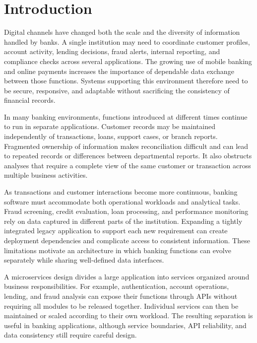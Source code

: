 \documentclass[conference]{IEEEtran}
\begin{document}
\section{Introduction}

Digital channels have changed both the scale and the diversity of information handled by banks. A single institution may need to coordinate customer profiles, account activity, lending decisions, fraud alerts, internal reporting, and compliance checks across several applications. The growing use of mobile banking and online payments increases the importance of dependable data exchange between those functions. Systems supporting this environment therefore need to be secure, responsive, and adaptable without sacrificing the consistency of financial records.

In many banking environments, functions introduced at different times continue to run in separate applications. Customer records may be maintained independently of transactions, loans, support cases, or branch reports. Fragmented ownership of information makes reconciliation difficult and can lead to repeated records or differences between departmental reports. It also obstructs analyses that require a complete view of the same customer or transaction across multiple business activities.

As transactions and customer interactions become more continuous, banking software must accommodate both operational workloads and analytical tasks. Fraud screening, credit evaluation, loan processing, and performance monitoring rely on data captured in different parts of the institution. Expanding a tightly integrated legacy application to support each new requirement can create deployment dependencies and complicate access to consistent information. These limitations motivate an architecture in which banking functions can evolve separately while sharing well-defined data interfaces.

A microservices design divides a large application into services organized around business responsibilities. For example, authentication, account operations, lending, and fraud analysis can expose their functions through APIs without requiring all modules to be released together. Individual services can then be maintained or scaled according to their own workload. The resulting separation is useful in banking applications, although service boundaries, API reliability, and data consistency still require careful design.
\end{document}
